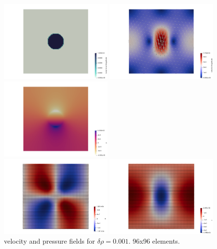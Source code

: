 \begin{center}
\includegraphics[width=5.6cm]{python_codes/fieldstone_80/results/sphere/rho_g}
\includegraphics[width=5.6cm]{python_codes/fieldstone_80/results/sphere/vel}
\includegraphics[width=5.6cm]{python_codes/fieldstone_80/results/sphere/p}\\
\includegraphics[width=5.6cm]{python_codes/fieldstone_80/results/sphere/u_dofs}
\includegraphics[width=5.6cm]{python_codes/fieldstone_80/results/sphere/v_dofs}\\
{\captionfont velocity and pressure fields for $\delta \rho=0.001$. 96x96 elements.}
\end{center}

